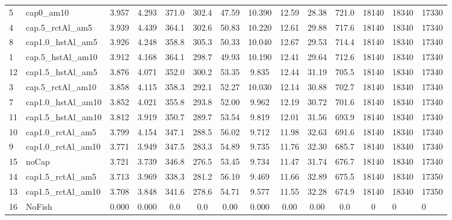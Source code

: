 \documentclass[11pt]{book}
\begin{document}
\begin{landscape}
\begin{longtable}[t]{llccccccccccll}
5 & cap0\_am10 & 3.957 & 4.293 & 371.0 & 302.4 & 47.59 & 10.390 & 12.59 & 28.38 & 721.0 & 18140 & 18340 & 17330\\
4 & cap.5\_rctAl\_am5 & 3.939 & 4.439 & 364.1 & 302.6 & 50.83 & 10.220 & 12.61 & 29.88 & 717.6 & 18140 & 18340 & 17340\\
8 & cap1.0\_hstAl\_am5 & 3.926 & 4.248 & 358.8 & 305.3 & 50.33 & 10.040 & 12.67 & 29.53 & 714.4 & 18140 & 18340 & 17340\\
1 & cap.5\_hstAl\_am10 & 3.912 & 4.168 & 364.1 & 298.7 & 49.93 & 10.190 & 12.41 & 29.64 & 712.6 & 18140 & 18340 & 17340\\
12 & cap1.5\_hstAl\_am5 & 3.876 & 4.071 & 352.0 & 300.2 & 53.35 & 9.835 & 12.44 & 31.19 & 705.5 & 18140 & 18340 & 17340\\
3 & cap.5\_rctAl\_am10 & 3.858 & 4.115 & 358.3 & 292.1 & 52.27 & 10.030 & 12.14 & 30.88 & 702.7 & 18140 & 18340 & 17340\\
7 & cap1.0\_hstAl\_am10 & 3.852 & 4.021 & 355.8 & 293.8 & 52.00 & 9.962 & 12.19 & 30.72 & 701.6 & 18140 & 18340 & 17340\\
11 & cap1.5\_hstAl\_am10 & 3.812 & 3.919 & 350.7 & 289.7 & 53.54 & 9.819 & 12.01 & 31.56 & 693.9 & 18140 & 18340 & 17340\\
10 & cap1.0\_rctAl\_am5 & 3.799 & 4.154 & 347.1 & 288.5 & 56.02 & 9.712 & 11.98 & 32.63 & 691.6 & 18140 & 18340 & 17340\\
9 & cap1.0\_rctAl\_am10 & 3.771 & 3.949 & 347.5 & 283.3 & 54.89 & 9.735 & 11.76 & 32.30 & 685.7 & 18140 & 18340 & 17340\\
15 & noCap & 3.721 & 3.739 & 346.8 & 276.5 & 53.45 & 9.734 & 11.47 & 31.74 & 676.7 & 18140 & 18340 & 17340\\
14 & cap1.5\_rctAl\_am5 & 3.713 & 3.969 & 338.3 & 281.2 & 56.10 & 9.469 & 11.66 & 32.89 & 675.5 & 18140 & 18340 & 17350\\
13 & cap1.5\_rctAl\_am10 & 3.708 & 3.848 & 341.6 & 278.6 & 54.71 & 9.577 & 11.55 & 32.28 & 674.9 & 18140 & 18340 & 17350\\
16 & NoFish & 0.000 & 0.000 & 0.0 & 0.0 & 0.00 & 0.000 & 0.00 & 0.00 & 0.0 & 0 & 0 & 0\\*
\end{longtable}
\end{landscape}
\endgroup{}

\newpage
\end{document}
